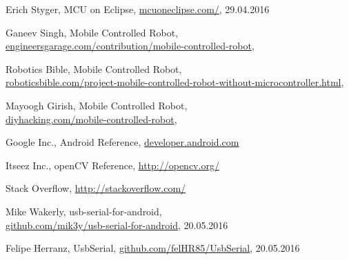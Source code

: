 \documentclass[openany]{mgr} %
\begin{document}
\begin{thebibliography}{9}

Erich Styger, MCU on Eclipse,
\url{mcuoneclipse.com/},
29.04.2016

Ganeev Singh, Mobile Controlled Robot,\\
\url{engineersgarage.com/contribution/mobile-controlled-robot},
\date{29.05.2016}

Robotics Bible, Mobile Controlled Robot,\\
\url{roboticsbible.com/project-mobile-controlled-robot-without-microcontroller.html},\\
\date{29.05.2016}

Mayoogh Girish, Mobile Controlled Robot,\\
\url{diyhacking.com/mobile-controlled-robot},
\date{29.05.2016}

Google Inc., Android Reference,
\url{developer.android.com}

Itseez Inc., openCV Reference,
\url{http://opencv.org/}

Stack Overflow,
\url{http://stackoverflow.com/}

Mike Wakerly, usb-serial-for-android,\\
\url{github.com/mik3y/usb-serial-for-android},
20.05.2016

Felipe Herranz, UsbSerial,
\url{github.com/felHR85/UsbSerial},
20.05.2016

\end{thebibliography}
\end{document}
